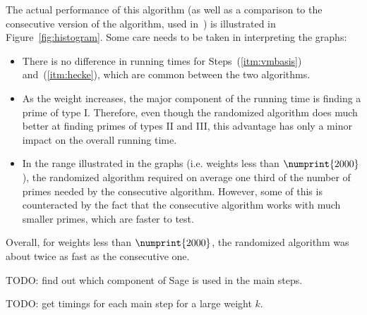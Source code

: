 \documentclass[11pt]{article}
\theoremstyle{plain}
\theoremstyle{definition}
\theoremstyle{remark}
\numberwithin{equation}{section}
\begin{document}
The actual performance of this algorithm (as well as a comparison to the
consecutive version of the algorithm, used in~\cite{ConreyFarmer}) is
illustrated in Figure~\ref{fig:histogram}.  Some care needs to be taken in
interpreting the graphs:
\begin{itemize}
  \item There is no difference in running times for Steps~(\ref{itm:vmbasis}) 
    and~(\ref{itm:hecke}), which 
    are common between the two algorithms.
  \item As the weight increases, the major component of the running time is
    finding a prime of type I.  Therefore, even though the randomized
    algorithm does much better at finding primes of types II and III, this
    advantage has only a minor impact on the overall running time.
  \item In the range illustrated in the graphs (i.e. weights less than
    $\numprint{2000}$), the randomized algorithm required on average one third
    of the number of primes needed by the consecutive algorithm.  However,
    some of this is counteracted by the fact that the consecutive algorithm
    works with much smaller primes, which are faster to test.
\end{itemize}

Overall, for weights less than $\numprint{2000}$, the randomized algorithm was
about twice as fast as the consecutive one.  

TODO: find out which component of Sage is used in the main steps.

TODO: get timings for each main step for a large weight $k$.
\end{document}
